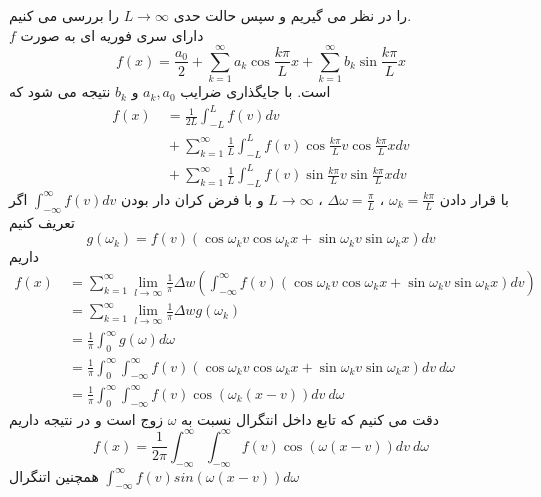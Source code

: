 را در نظر می گیریم و سپس حالت حدی
$L\to\infty$
را بررسی می کنیم.\\
$f$
دارای سری فوریه ای به صورت
\[
f(x)=\frac{a_{0}}{2}+\sum_{k=1}^{\infty} a_{k} \cos \frac{k \pi}{L} x+\sum_{k=1}^{\infty} b_{k} \sin \frac{k \pi }{L}x
\]
است. با جایگذاری ضرایب
$a_k,a_0$
و
$b_k$
نتیجه می شود که
\begin{equation*}
	\begin{aligned}
		f(x)
		{} &\
		=\frac{1}{2 L} \int_{-L}^{L} f(v) d v \\ &\ + \sum_{k=1}^{\infty}\frac{1}{ L} \int_{-L}^{L} f(v) \cos \frac{k \pi}{L} v \cos \frac{k \pi}{L}xdv \\ &\ + \sum_{k=1}^{\infty}\frac{1}{ L} \int_{-L}^{L} f(v) \sin \frac{k \pi}{L} v \sin \frac{k \pi}{L}xdv
	\end{aligned}
\end{equation*}
با قرار دادن
$\omega_k=\frac{k\pi}{L}$
،
$\Delta\omega=\frac{\pi}{L}$
،
$L\to\infty$
و با فرض کران دار بودن
$\int_{-\infty}^\infty{f(v)dv}$
اگر تعریف کنیم
\[
g\left(\omega_k\right)=f(v)(\cos  \omega_{k} v \cos  \omega_{k} x+\sin \omega_{k} v \sin \omega_{k} x) d v
\]
داریم
\begin{equation*}
	\begin{aligned}
		f(x) {} &\ =
		\sum_{k=1}^{\infty} \lim _{l \rightarrow \infty} \frac{1}{\pi} \Delta w(\int_{-{\infty}}^{{\infty}} f(v)(\cos  \omega_{k} v \cos  \omega_{k} x+\sin \omega_{k} v \sin \omega_{k} x) d v)
		\\ &\
		=\sum_{k=1}^{\infty} \lim _{l \rightarrow \infty} \frac{1}{\pi} \Delta w g(\omega_{k}) 
		\\ &\
		= \frac{1}{\pi}\int_{0}^{{\infty}}g(\omega) d\omega
		\\ &\
		= \frac{1}{\pi}\int_{0}^{{\infty}}\int_{-{\infty}}^{{\infty}} f(v)(\cos  \omega_{k} v \cos  \omega_{k} x+\sin \omega_{k} v \sin \omega_{k} x) d v \ d\omega
		\\ &\
		= \frac{1}{\pi}\int_{0}^{{\infty}}\int_{-{\infty}}^{{\infty}} f(v)\cos(  \omega_{k}(x-v) ) d v \ d\omega
	\end{aligned}
\end{equation*}
دقت می کنیم که تابع داخل انتگرال نسبت به
$\omega$
زوج است و در نتیجه داریم
\[
f(x)= \frac{1}{2\pi}\int_{-{\infty}}^{{\infty}}\int_{-{\infty}}^{{\infty}} f(v)\cos(  \omega(x-v) ) d v \ d\omega
\]
همچنین اتنگرال
$\int_{-\infty}^\infty{f(v)sin\left(\omega(x-v)\right)d\omega}\quad$

